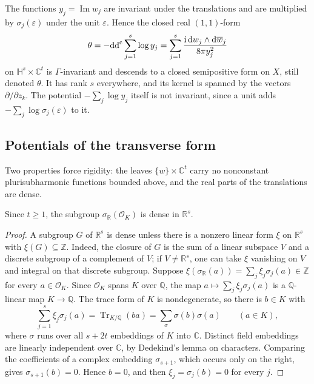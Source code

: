 The functions $y_j=\operatorname{Im}w_j$ are invariant under the translations and are multiplied by $\sigma_j(\varepsilon)$ under the unit $\varepsilon$. Hence the closed real $(1,1)$-form
\[
 \theta=-\mathrm{dd}^{\mathrm{c}}\sum_{j=1}^s\log y_j
       =\sum_{j=1}^s\frac{\mathrm i\,\mathrm dw_j\wedge\mathrm d\overline w_j}{8\pi y_j^2}
\]
on $\mathbb H^s\times\mathbb C^t$ is $\Gamma$-invariant and descends to a closed semipositive form on $X$, still denoted $\theta$. It has rank $s$ everywhere, and its kernel is spanned by the vectors $\partial/\partial z_k$. The potential $-\sum_j\log y_j$ itself is not invariant, since a unit adds $-\sum_j\log\sigma_j(\varepsilon)$ to it.

\subsection{Potentials of the transverse form}

Two properties force rigidity: the leaves $\{w\}\times\mathbb C^t$ carry no nonconstant plurisubharmonic functions bounded above, and the real parts of the translations are dense.

\begin{lemma}\label{lem:ot-real-density}
Since $t\geq1$, the subgroup $\sigma_{\mathbb R}(\mathcal O_K)$ is dense in $\mathbb R^s$.
\end{lemma}
\begin{proof}
A subgroup $G$ of $\mathbb R^s$ is dense unless there is a nonzero linear form $\xi$ on $\mathbb R^s$ with $\xi(G)\subseteq\mathbb Z$. Indeed, the closure of $G$ is the sum of a linear subspace $V$ and a discrete subgroup of a complement of $V$; if $V\neq\mathbb R^s$, one can take $\xi$ vanishing on $V$ and integral on that discrete subgroup. Suppose $\xi(\sigma_{\mathbb R}(a))=\sum_j\xi_j\sigma_j(a)\in\mathbb Z$ for every $a\in\mathcal O_K$. Since $\mathcal O_K$ spans $K$ over $\mathbb Q$, the map $a\mapsto\sum_j\xi_j\sigma_j(a)$ is a $\mathbb Q$-linear map $K\to\mathbb Q$. The trace form of $K$ is nondegenerate, so there is $b\in K$ with
\[
 \sum_{j=1}^s\xi_j\sigma_j(a)=\operatorname{Tr}_{K/\mathbb Q}(ba)
 =\sum_{\sigma}\sigma(b)\sigma(a)
 \qquad(a\in K),
\]
where $\sigma$ runs over all $s+2t$ embeddings of $K$ into $\mathbb C$. Distinct field embeddings are linearly independent over $\mathbb C$, by Dedekind's lemma on characters. Comparing the coefficients of a complex embedding $\sigma_{s+1}$, which occurs only on the right, gives $\sigma_{s+1}(b)=0$. Hence $b=0$, and then $\xi_j=\sigma_j(b)=0$ for every $j$.
\end{proof}

